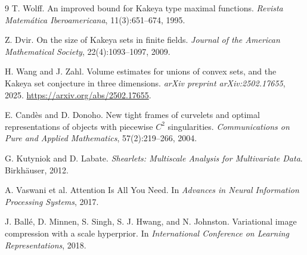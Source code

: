 \documentclass[11pt]{article}
\begin{document}
\begin{thebibliography}{9}
T. Wolff.
\newblock An improved bound for Kakeya type maximal functions.
\newblock \emph{Revista Matem\'atica Iberoamericana}, 11(3):651--674, 1995.

Z. Dvir.
\newblock On the size of Kakeya sets in finite fields.
\newblock \emph{Journal of the American Mathematical Society}, 22(4):1093--1097, 2009.

H. Wang and J. Zahl.
\newblock Volume estimates for unions of convex sets, and the Kakeya set conjecture in three dimensions.
\newblock \emph{arXiv preprint arXiv:2502.17655}, 2025.
\newblock \url{https://arxiv.org/abs/2502.17655}.

E. Cand\`es and D. Donoho.
\newblock New tight frames of curvelets and optimal representations of objects with piecewise $C^2$ singularities.
\newblock \emph{Communications on Pure and Applied Mathematics}, 57(2):219--266, 2004.

G. Kutyniok and D. Labate.
\newblock \emph{Shearlets: Multiscale Analysis for Multivariate Data}.
\newblock Birkh\"auser, 2012.

A. Vaswani et al.
\newblock Attention Is All You Need.
\newblock In \emph{Advances in Neural Information Processing Systems}, 2017.

J. Ball\'e, D. Minnen, S. Singh, S. J. Hwang, and N. Johnston.
\newblock Variational image compression with a scale hyperprior.
\newblock In \emph{International Conference on Learning Representations}, 2018.
\end{thebibliography}
\end{document}
